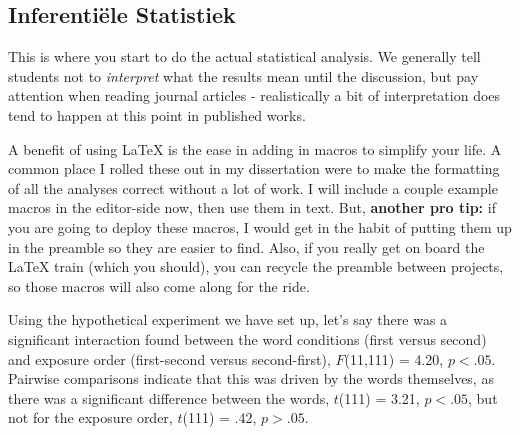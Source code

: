 \documentclass[stu,12pt,floatsintext]{apa7}
\begin{document}
\subsection{Inferentiële Statistiek}  %

This is where you start to do the actual statistical analysis. We generally tell students not to \textit{interpret} what the results mean until the discussion, but pay attention when reading journal articles - realistically a bit of interpretation does tend to happen at this point in published works.

A benefit of using \LaTeX{} is the ease in adding in macros to simplify your life. A common place I rolled these out in my dissertation were to make the formatting of all the analyses correct without a lot of work. I will include a couple example macros in the editor-side now, then use them in text. But, \textbf{another pro tip:} if you are going to deploy these macros, I would get in the habit of putting them up in the preamble so they are easier to find. Also, if you really get on board the \LaTeX{} train (which you should), you can recycle the preamble between projects, so those macros will also come along for the ride.

\newcommand{\ttestSig}[2]{$t$(#1) = #2, $p < .05$}
\newcommand{\ttestInsig}[2]{$t$(#1) = #2, $p > .05$}
\newcommand{\anovaSig}[3]{$F$(#1,#2) = #3, $p < .05$}
\newcommand{\anovaInsig}[3]{$F$(#1,#2) = #3, $p > .05$}

Using the hypothetical experiment we have set up, let's say there was a significant interaction found between the word conditions (first versus second) and exposure order (first-second versus second-first), \anovaSig{11}{111}{4.20}. Pairwise comparisons indicate that this was driven by the words themselves, as there was a significant difference between the words, \ttestSig{111}{3.21}, but not for the exposure order, \ttestInsig{111}{.42}.
\end{document}
